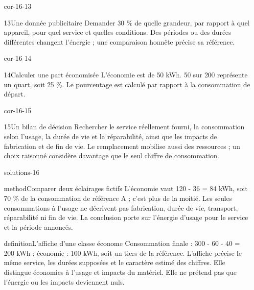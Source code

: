 \documentclass[12pt,twoside,openany]{book}
\begin{document}
\begin{blocLivre}{cor-16-13}
\begin{corrige}{13}{Une donnée publicitaire}
Demander 30 \% de quelle grandeur, par rapport à quel appareil, pour quel service et quelles conditions. Des périodes ou des durées différentes changent l’énergie ; une comparaison honnête précise sa référence.\par
\end{corrige}\end{blocLivre}
\begin{blocLivre}{cor-16-14}
\begin{corrige}{14}{Calculer une part économisée}
L’économie est de 50 kWh. 50 sur 200 représente un quart, soit 25 \%. Le pourcentage est calculé par rapport à la consommation de départ.\par
\end{corrige}\end{blocLivre}
\begin{blocLivre}{cor-16-15}
\begin{corrige}{15}{Un bilan de décision}
Rechercher le service réellement fourni, la consommation selon l’usage, la durée de vie et la réparabilité, ainsi que les impacts de fabrication et de fin de vie. Le remplacement mobilise aussi des ressources ; un choix raisonné considère davantage que le seul chiffre de consommation.\par
\end{corrige}\end{blocLivre}
\label{solutions-16}
\begin{pcFiche}{solutions-16}
\begin{pcEncadre}{method}{Comparer deux éclairages fictifs}
L’économie vaut 120 - 36 = 84 kWh, soit 70 \% de la consommation de référence A ; c’est plus de la moitié. Les seules consommations à l’usage ne décrivent pas fabrication, durée de vie, transport, réparabilité ni fin de vie. La conclusion porte sur l’énergie d’usage pour le service et la période annoncés.\par
\end{pcEncadre}
\label{defi-cor-16}
\begin{pcEncadre}{definition}{L’affiche d’une classe économe}
Consommation finale : 300 - 60 - 40 = 200 kWh ; économie : 100 kWh, soit un tiers de la référence. L’affiche précise le même service, les durées supposées et le caractère estimé des chiffres. Elle distingue économies à l’usage et impacts du matériel. Elle ne prétend pas que l’énergie ou les impacts deviennent nuls.\par
\end{pcEncadre}
\end{pcFiche}
\end{document}
